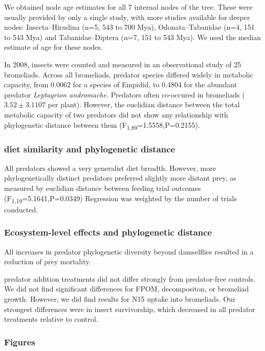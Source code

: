 We obtained node age estimates for all 7 internal nodes of the tree.
These were usually provided by only a single study, with more studies
available for deeper nodes: Insecta--Hirudina (n=5, 543 to 700 Mya),
Odonata--Tabanidae (n=4, 151 to 543 Mya) and Tabanidae--Diptera (n=7,
151 to 543 Mya). We used the median estimate of age for these nodes.

In 2008, insects were counted and measured in an observational study of
25 bromeliads. Across all bromeliads, predator species differed widely
in metabolic capacity, from 0.0062 for a species of Empidid, to 0.4804
for the abundant predator \emph{Leptagrion andromache}. Predators often
co-occured in bromeliads ($3.52 \pm 3.1107$ per plant). However, the
euclidian distance between the total metabolic capacity of two predators
did not show any relationship with phylogenetic distance between them
(F\textsubscript{1,89}=1.5558,P=0.2155).

\subsubsection{diet similarity and phylogenetic distance}

All predators showed a very generalist diet breadth. However, more
phylogenetically distinct predators preferred slightly more distant
prey, as measured by euclidian distance between feeding trial outcomes
(F\textsubscript{1,19}=5.1641,P=0.0349) Regression was weighted by the
number of trials conducted.

\subsubsection{Ecosystem-level effects and phylogenetic distance}

All increases in predator phylogenetic diversity beyond damselflies
resulted in a reduction of prey mortality.

predator addition treatments did not differ strongly from predator-free
controls. We did not find significant differences for FPOM,
decompositon, or bromeliad growth. However, we did find results for N15
uptake into bromeliads. Our strongest differences were in insect
survivorship, which decreased in all predator treatments relative to
control.

\subsubsection{Figures}

